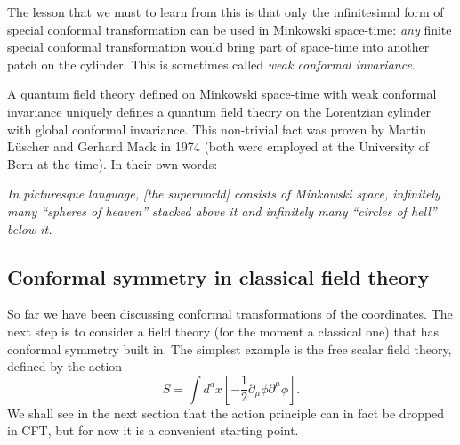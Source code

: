 \documentclass[a4paper,12pt]{article}
\numberwithin{equation}{section}
\begin{document}
The lesson that we must to learn from this is that only the infinitesimal form of special conformal transformation can be used in Minkowski space-time: \emph{any} finite special conformal transformation would bring part of space-time into another patch on the cylinder.
This is sometimes called \emph{weak conformal invariance}.

A quantum field theory defined on Minkowski space-time with weak conformal invariance uniquely defines a quantum field theory on the Lorentzian cylinder with global conformal invariance. This non-trivial fact was proven by Martin Lüscher and Gerhard Mack in 1974 \cite{Luscher:1974ez} (both were employed at the University of Bern at the time). In their own words:

\begin{center}

\parbox{11cm}{%
\emph{In picturesque language, [the superworld] consists of Minkowski space, infinitely many ``spheres of heaven'' stacked above it and infinitely many ``circles of hell'' below it.}}

\end{center}


\subsection{Conformal symmetry in classical field theory}

So far we have been discussing conformal transformations of the coordinates. The next step is to consider a field theory (for the moment a classical one) that has conformal symmetry built in. The simplest example is the free scalar field theory, defined by the action
\begin{equation}
	S = \int d^dx
	\left[ - \frac{1}{2} \partial_\mu \phi \partial^\mu \phi \right].
	\label{eq:freescalaraction}
\end{equation}
We shall see in the next section that the action principle can in fact be dropped in CFT, but for now it is a convenient starting point.
\end{document}
